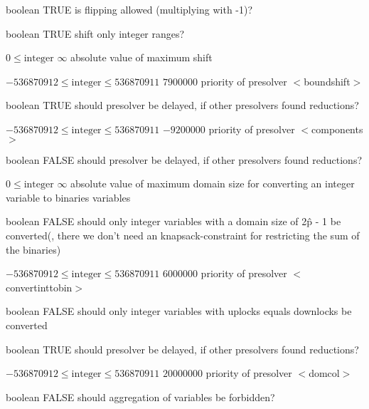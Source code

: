 %
{boolean}%
{TRUE}%
{is flipping allowed (multiplying with -1)?}%
{}

%
{boolean}%
{TRUE}%
{shift only integer ranges?}%
{}

%
{$0\leq\textrm{integer}$}%
{$\infty$}%
{absolute value of maximum shift}%
{}

%
{$-536870912\leq\textrm{integer}\leq536870911$}%
{$7900000$}%
{priority of presolver $<$boundshift$>$}%
{}

%
{boolean}%
{TRUE}%
{should presolver be delayed, if other presolvers found reductions?}%
{}

%
{$-536870912\leq\textrm{integer}\leq536870911$}%
{$-9200000$}%
{priority of presolver $<$components$>$}%
{}

%
{boolean}%
{FALSE}%
{should presolver be delayed, if other presolvers found reductions?}%
{}

%
{$0\leq\textrm{integer}$}%
{$\infty$}%
{absolute value of maximum domain size for converting an integer variable to binaries variables}%
{}

%
{boolean}%
{FALSE}%
{should only integer variables with a domain size of 2\^p - 1 be converted(, there we don't need an knapsack-constraint for restricting the sum of the binaries)}%
{}

%
{$-536870912\leq\textrm{integer}\leq536870911$}%
{$6000000$}%
{priority of presolver $<$convertinttobin$>$}%
{}

%
{boolean}%
{FALSE}%
{should only integer variables with uplocks equals downlocks be converted}%
{}

%
{boolean}%
{TRUE}%
{should presolver be delayed, if other presolvers found reductions?}%
{}

%
{$-536870912\leq\textrm{integer}\leq536870911$}%
{$20000000$}%
{priority of presolver $<$domcol$>$}%
{}

%
{boolean}%
{FALSE}%
{should aggregation of variables be forbidden?}%
{}

